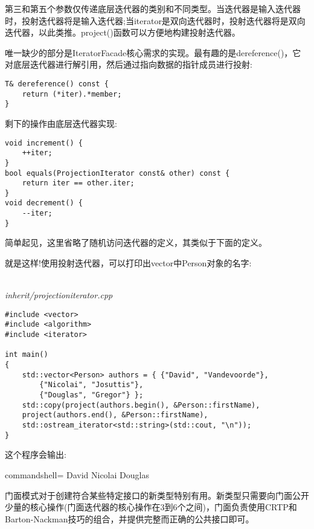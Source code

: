 第三和第五个参数仅传递底层迭代器的类别和不同类型。当迭代器是输入迭代器时，投射迭代器将是输入迭代器;当iterator是双向迭代器时，投射迭代器将是双向迭代器，以此类推。project()函数可以方便地构建投射迭代器。

唯一缺少的部分是IteratorFacade核心需求的实现。最有趣的是dereference()，它对底层迭代器进行解引用，然后通过指向数据的指针成员进行投射:

\begin{lstlisting}[style=styleCXX]
T& dereference() const {
	return (*iter).*member;
}
\end{lstlisting}

剩下的操作由底层迭代器实现:

\begin{lstlisting}[style=styleCXX]
void increment() {
	++iter;
}
bool equals(ProjectionIterator const& other) const {
	return iter == other.iter;
}
void decrement() {
	--iter;
}
\end{lstlisting}

简单起见，这里省略了随机访问迭代器的定义，其类似于下面的定义。

就是这样!使用投射迭代器，可以打印出vector中Person对象的名字:

\hspace*{\fill} \\ %
\noindent
\textit{inherit/projectioniterator.cpp}
\begin{lstlisting}[style=styleCXX]
#include <vector>
#include <algorithm>
#include <iterator>

int main()
{
	std::vector<Person> authors = { {"David", "Vandevoorde"},
		{"Nicolai", "Josuttis"},
		{"Douglas", "Gregor"} };
	std::copy(project(authors.begin(), &Person::firstName),
	project(authors.end(), &Person::firstName),
	std::ostream_iterator<std::string>(std::cout, "\n"));
}
\end{lstlisting}

这个程序会输出:

\begin{tcblisting}{commandshell={}}
David
Nicolai
Douglas
\end{tcblisting}

门面模式对于创建符合某些特定接口的新类型特别有用。新类型只需要向门面公开少量的核心操作(门面迭代器的核心操作在3到6个之间)，门面负责使用CRTP和Barton-Nackman技巧的组合，并提供完整而正确的公共接口即可。












